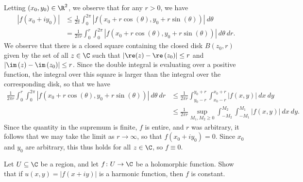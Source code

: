 \documentclass[10pt]{mypackage}
\begin{document}
\begin{solution}
  Letting $\left( x_0,y_0 \right)\in \R^{2}$, we observe that for any $r > 0$, we have
  \begin{align*}
    \left\vert f(x_0 + iy_0) \right\vert &\leq \frac{1}{2\pi} \int_{0}^{2\pi} \left\vert f\left( x_0 + r\cos\left( \theta \right),y_0 + r\sin\left( \theta \right) \right) \right\vert\:d\theta\\
                                         &= \frac{1}{2\pi r} \int_{0}^{r} \int_{0}^{2\pi} \left\vert f\left( x_0 + r\cos\left( \theta \right),y_0 + r\sin\left( \theta \right) \right) \right\vert\:d\theta\:dr.
  \end{align*}
  We observe that there is a closed square containing the closed disk $B\left( z_0,r \right)$ given by the set of all $z\in \C$ such that $ \left\vert \re(z) - \re\left( z_0 \right) \right\vert \leq r $ and $ \left\vert \im\left( z \right) - \im\left( z_0 \right) \right\vert \leq r $. Since the double integral is evaluating over a positive function, the integral over this square is larger than the integral over the corresponding disk, so that we have
  \begin{align*}
    \frac{1}{2\pi r} \int_{0}^{r} \int_{0}^{2\pi} \left\vert f\left( x_0 + r\cos\left( \theta \right),y_0 + r\sin\left( \theta \right) \right) \right\vert\:d\theta\:dr &\leq \frac{1}{2\pi r} \int_{y_0 - r}^{y_0 + r} \int_{x_0 - r}^{x_0 + r} \left\vert f\left( x,y \right) \right\vert\:dx\:dy\\
                                                                                                                                                                                   &\leq \frac{1}{2\pi r} \sup_{M_1,M_2\geq 0} \int_{-M_2}^{M_2} \int_{-M_1}^{M_1} \left\vert f\left( x,y \right) \right\vert\:dx\:dy.
  \end{align*}
  Since the quantity in the supremum is finite, $f$ is entire, and $r$ was arbitrary, it follows that we may take the limit as $r\rightarrow \infty$, so that $f\left( x_0 + iy_0 \right) = 0$. Since $x_0$ and $y_0$ are arbitrary, this thus holds for all $z\in \C$, so $f \equiv 0$.
\end{solution}
\begin{problem}[Problem 4]
  Let $U\subseteq \C$ be a region, and let $f\colon U\rightarrow \C$ be a holomorphic function. Show that if $ u\left( x,y \right) = \left\vert f\left( x + iy \right) \right\vert $ is a harmonic function, then $f$ is constant.
\end{problem}
\end{document}
